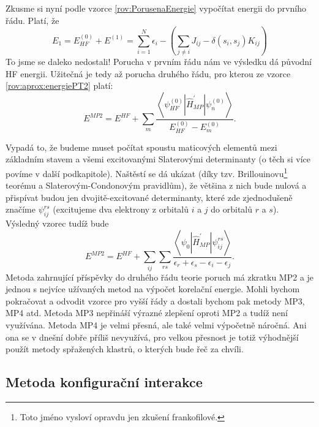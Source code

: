 Zkusme si nyní podle vzorce \eqref{rov:PorusenaEnergie} vypočítat energii do prvního řádu. Platí, že
\begin{equation}
E_1=E^{(0)}_{HF} + E^{(1)}= \sum_{i=1}^N \epsilon_i - \left(\sum_{j\neq i} J_{ij} - \delta(s_i,s_j) {K}_{ij} \right)
\end{equation}
To jsme se daleko nedostali! Porucha v prvním řádu nám ve výsledku dá původní HF energii.
Užitečná je tedy až porucha druhého řádu, pro kterou ze vzorce \eqref{rov:aprox:energiePT2} platí:
\begin{equation}
E^{MP2} = E^{HF} + \sum_m \frac{\left < \psi^{(0)}_{HF}|\hat{H}^{\prime}_{MP}|\psi_n^{(0)} \right >}{E_{HF}^{(0)}-E_m^{(0)}}.
\end{equation}

Vypadá to, že budeme muset počítat spoustu maticových elementů mezi základním stavem a všemi excitovanými Slaterovými determinanty (o těch si více povíme v další podkapitole). Naštěstí se dá ukázat (díky tzv. Brillouinovu\footnote{Toto jméno vysloví opravdu jen zkušení frankofilové.} teorému a Slaterovým-Condonovým pravidlům), že většina z nich bude nulová a přispívat budou jen dvojitě-excitované determinanty, které zde zjednodušeně značíme $\psi_{ij}^{rs}$ (excitujeme dva elektrony z orbitalů $i$ a $j$ do orbitalů $r$ a $s$). Výsledný vzorec tudíž bude
\begin{equation}
E^{MP2}= E^{HF} + \sum_{ij} \sum_{rs} \frac{\left < \psi_0 | \hat{H}^{\prime}_{MP} | \psi_{ij}^{rs} \right > }{\epsilon_r+\epsilon_s-\epsilon_i-\epsilon_j} .
\end{equation}
Metoda zahrnující příspěvky do druhého řádu teorie poruch má zkratku MP2 a je jednou s nejvíce užívaných metod na výpočet korelační energie. Mohli bychom pokračovat a odvodit vzorce pro vyšší řády a dostali bychom pak metody MP3, MP4 atd. 
Metoda MP3 nepřináší výrazné zlepšení oproti MP2 a tudíž není využívána. Metoda MP4 je velmi přesná, ale také velmi výpočetně náročná. Ani ona se v dnešní dobře příliš nevyužívá, pro velkou přesnost je totiž výhodnější použít metody spřažených klastrů, o kterých bude řeč za chvíli.


\subsection{Metoda konfigurační interakce}

